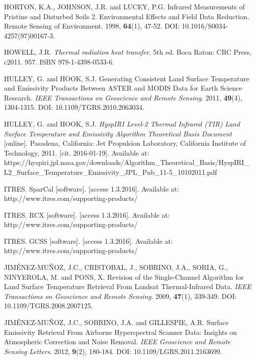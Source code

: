 \begin{thebibliography}{10}
 HORTON, K.A., JOHNSON, J.R. and LUCEY, P.G. Infrared Measurements of Pristine and Disturbed Soils 2. Environmental Effects and Field Data Reduction. Remote Sensing of Environment. 1998, \textbf{64}(1), 47-52. DOI: 10.1016/S0034-4257(97)00167-3.

 HOWELL, J.R. \textit{Thermal radiation heat transfer}. 5th ed. Boca Raton: CRC Press, c2011. 957. ISBN 978-1-4398-0533-6.

 HULLEY, G. and HOOK, S.J. Generating Consistent Land Surface Temperature and Emissivity Products Between ASTER and MODIS Data for Earth Science Research. \textit{IEEE Transactions on Geoscience and Remote Sensing}. 2011, \textbf{49}(4), 1304-1315. DOI: 10.1109/TGRS.2010.2063034.

  HULLEY, G. and HOOK, S.J. \textit{HyspIRI Level-2 Thermal Infrared (TIR) Land Surface Temperature and Emissivity Algorithm Theoretical Basis Document} [online]. Pasadena, California: Jet Propulsion Laboratory, California Institute of Technology, 2011. [cit. 2016-01-19]. Available at: https://hyspiri.jpl.nasa.gov/downloads/Algorithm\_Theoretical\_Basis/HyspIRI\_L2\linebreak\_Surface\_Temperature\_Emissivity\_JPL\_Pub\_11-5\_10102011.pdf

 ITRES. SparCal [software]. [access  1.3.2016]. Available at: http://www.itres.com\linebreak/supporting-products/

 ITRES. RCX [software]. [access 1.3.2016]. Available at: http://www.itres.com\linebreak/supporting-products/

 ITRES. GCSS [software]. [access 1.3.2016]. Available at: http://www.itres.com\linebreak/supporting-products/

 JIMÉNEZ-MUÑOZ, J.C., CRISTOBAL, J., SOBRINO, J.A., SORIA, G., NINYEROLA, M. and PONS, X. Revision of the Single-Channel Algorithm for Land Surface Temperature Retrieval From Landsat Thermal-Infrared Data. \textit{IEEE Transactions on Geoscience and Remote Sensing}. 2009, \textbf{47}(1), 339-349. DOI: 10.1109/TGRS.2008.2007125.

 JIMÉNEZ-MUÑOZ, J.C., SOBRINO, J.A. and GILLESPIE, A.R. Surface Emissivity Retrieval From Airborne Hyperspectral Scanner Data: Insights on Atmospheric Correction and Noise Removal. \textit{IEEE Geoscience and Remote Sensing Letters}. 2012, \textbf{9}(2), 180-184. DOI: 10.1109/LGRS.2011.2163699.


\end{thebibliography}
